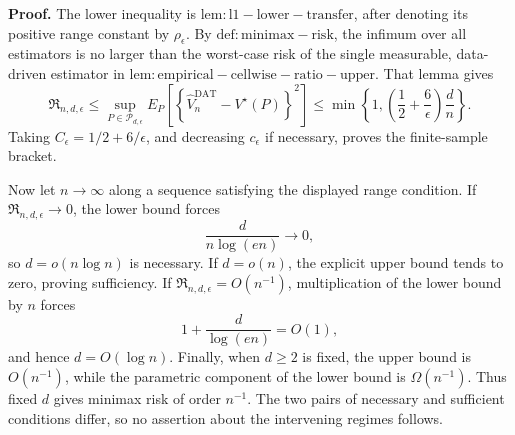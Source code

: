 \textbf{Proof.}
The lower inequality is \(\mathrm{lem:l1-lower-transfer}\), after denoting its positive range constant by \(\rho_\epsilon\).  By \(\mathrm{def:minimax-risk}\), the infimum over all estimators is no larger than the worst-case risk of the single measurable, data-driven estimator in \(\mathrm{lem:empirical-cellwise-ratio-upper}\).  That lemma gives
\[
 \mathfrak R_{n,d,\epsilon}
 \le\sup_{P\in\mathcal P_{d,\epsilon}}
 E_P\!\left[
  \left\{\widehat V_n^{\mathrm{DAT}}-V^\star(P)\right\}^2
 \right]
 \le\min\!\left\{1,
   \left(\frac12+\frac6\epsilon\right)\frac dn
 \right\}.
\]
Taking \(C_\epsilon=1/2+6/\epsilon\), and decreasing \(c_\epsilon\) if necessary, proves the finite-sample bracket.

Now let \(n\to\infty\) along a sequence satisfying the displayed range condition.  If \(\mathfrak R_{n,d,\epsilon}\to0\), the lower bound forces
\[
 \frac d{n\log(en)}\longrightarrow0,
\]
so \(d=o(n\log n)\) is necessary.  If \(d=o(n)\), the explicit upper bound tends to zero, proving sufficiency.  If \(\mathfrak R_{n,d,\epsilon}=O(n^{-1})\), multiplication of the lower bound by \(n\) forces
\[
 1+\frac d{\log(en)}=O(1),
\]
and hence \(d=O(\log n)\).  Finally, when \(d\ge2\) is fixed, the upper bound is \(O(n^{-1})\), while the parametric component of the lower bound is \(\Omega(n^{-1})\).  Thus fixed \(d\) gives minimax risk of order \(n^{-1}\).  The two pairs of necessary and sufficient conditions differ, so no assertion about the intervening regimes follows.
